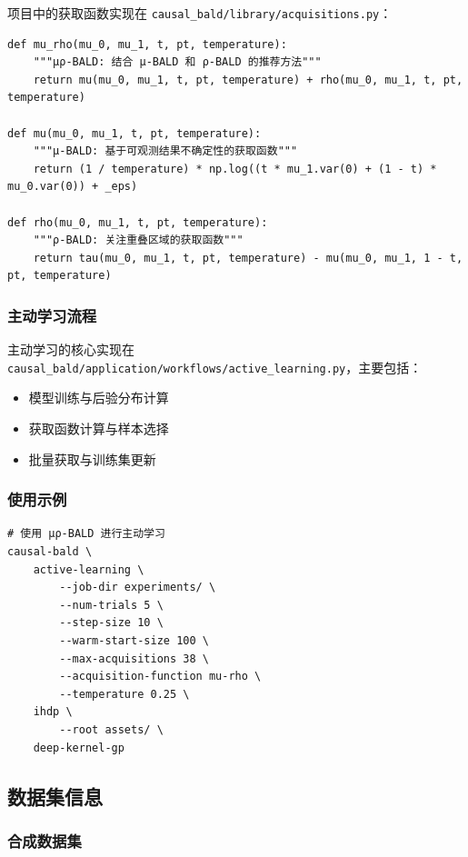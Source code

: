 \documentclass[12pt]{article}
\begin{document}
项目中的获取函数实现在 \texttt{causal\_bald/library/acquisitions.py}：

\begin{lstlisting}
def mu_rho(mu_0, mu_1, t, pt, temperature):
    """μρ-BALD: 结合 μ-BALD 和 ρ-BALD 的推荐方法"""
    return mu(mu_0, mu_1, t, pt, temperature) + rho(mu_0, mu_1, t, pt, temperature)

def mu(mu_0, mu_1, t, pt, temperature):
    """μ-BALD: 基于可观测结果不确定性的获取函数"""
    return (1 / temperature) * np.log((t * mu_1.var(0) + (1 - t) * mu_0.var(0)) + _eps)

def rho(mu_0, mu_1, t, pt, temperature):
    """ρ-BALD: 关注重叠区域的获取函数"""
    return tau(mu_0, mu_1, t, pt, temperature) - mu(mu_0, mu_1, 1 - t, pt, temperature)
\end{lstlisting}

\subsubsection{主动学习流程}

主动学习的核心实现在 \texttt{causal\_bald/application/workflows/active\_learning.py}，主要包括：
\begin{itemize}
\item 模型训练与后验分布计算
\item 获取函数计算与样本选择
\item 批量获取与训练集更新
\end{itemize}

\subsubsection{使用示例}

\begin{verbatim}
# 使用 μρ-BALD 进行主动学习
causal-bald \
    active-learning \
        --job-dir experiments/ \
        --num-trials 5 \
        --step-size 10 \
        --warm-start-size 100 \
        --max-acquisitions 38 \
        --acquisition-function mu-rho \
        --temperature 0.25 \
    ihdp \
        --root assets/ \
    deep-kernel-gp
\end{verbatim}

\subsection{数据集信息}

\subsubsection{合成数据集}
\end{document}
